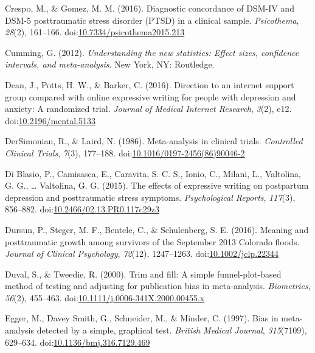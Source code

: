 \documentclass[man, mask]{apa6}
\theoremstyle{definition}
\theoremstyle{definition}
\theoremstyle{definition}
\theoremstyle{remark}
\begin{document}
\hypertarget{ref-Crespo2016}{}
Crespo, M., \& Gomez, M. M. (2016). Diagnostic concordance of DSM-IV and
DSM-5 posttraumatic stress disorder (PTSD) in a clinical sample.
\emph{Psicothema}, \emph{28}(2), 161--166.
doi:\href{https://doi.org/10.7334/psicothema2015.213}{10.7334/psicothema2015.213}

\hypertarget{ref-Cumming2012}{}
Cumming, G. (2012). \emph{Understanding the new statistics: Effect
sizes, confidence intervals, and meta-analysis}. New York, NY:
Routledge.

\hypertarget{ref-Dean2016}{}
Dean, J., Potts, H. W., \& Barker, C. (2016). Direction to an internet
support group compared with online expressive writing for people with
depression and anxiety: A randomized trial. \emph{Journal of Medical
Internet Research}, \emph{3}(2), e12.
doi:\href{https://doi.org/10.2196/mental.5133}{10.2196/mental.5133}

\hypertarget{ref-DerSimonian1986}{}
DerSimonian, R., \& Laird, N. (1986). Meta-analysis in clinical trials.
\emph{Controlled Clinical Trials}, \emph{7}(3), 177--188.
doi:\href{https://doi.org/10.1016/0197-2456(86)90046-2}{10.1016/0197-2456(86)90046-2}

\hypertarget{ref-Blasio2015a}{}
Di Blasio, P., Camisasca, E., Caravita, S. C. S., Ionio, C., Milani, L.,
Valtolina, G. G., \ldots{} Valtolina, G. G. (2015). The effects of
expressive writing on postpartum depression and posttraumatic stress
symptoms. \emph{Psychological Reports}, \emph{117}(3), 856--882.
doi:\href{https://doi.org/10.2466/02.13.PR0.117c29z3}{10.2466/02.13.PR0.117c29z3}

\hypertarget{ref-Dursun2016}{}
Dursun, P., Steger, M. F., Bentele, C., \& Schulenberg, S. E. (2016).
Meaning and posttraumatic growth among survivors of the September 2013
Colorado floods. \emph{Journal of Clinical Psychology}, \emph{72}(12),
1247--1263.
doi:\href{https://doi.org/10.1002/jclp.22344}{10.1002/jclp.22344}

\hypertarget{ref-Duval2000}{}
Duval, S., \& Tweedie, R. (2000). Trim and fill: A simple
funnel-plot-based method of testing and adjusting for publication bias
in meta-analysis. \emph{Biometrics}, \emph{56}(2), 455--463.
doi:\href{https://doi.org/10.1111/j.0006-341X.2000.00455.x}{10.1111/j.0006-341X.2000.00455.x}

\hypertarget{ref-Egger1997}{}
Egger, M., Davey Smith, G., Schneider, M., \& Minder, C. (1997). Bias in
meta-analysis detected by a simple, graphical test. \emph{British
Medical Journal}, \emph{315}(7109), 629--634.
doi:\href{https://doi.org/10.1136/bmj.316.7129.469}{10.1136/bmj.316.7129.469}
\end{document}
